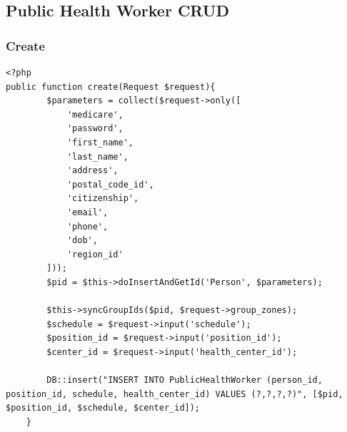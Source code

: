 \subsection{Public Health Worker CRUD}
\subsubsection{Create}
\begin{verbatim}
<?php
public function create(Request $request){
        $parameters = collect($request->only([
            'medicare',
            'password',
            'first_name',
            'last_name',
            'address',
            'postal_code_id',
            'citizenship',
            'email',
            'phone',
            'dob',
            'region_id'
        ]));
        $pid = $this->doInsertAndGetId('Person', $parameters);

        $this->syncGroupIds($pid, $request->group_zones);
        $schedule = $request->input('schedule');
        $position_id = $request->input('position_id');
        $center_id = $request->input('health_center_id');

        DB::insert("INSERT INTO PublicHealthWorker (person_id, position_id, schedule, health_center_id) VALUES (?,?,?,?)", [$pid, $position_id, $schedule, $center_id]);
    }
\end{verbatim}
